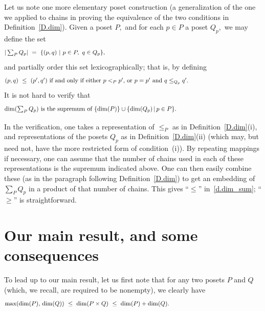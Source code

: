 \documentclass{amsart}
\numberwithin{equation}{section}
\numberwithin{theorem}{section}
\renewcommand{\r}{\mathrm}
\newcommand{\2}{\mathbf{2}}
\begin{document}
Let us note one more elementary poset construction
(a generalization of the one we applied to chains
in proving the equivalence of the two conditions
in Definition~\ref{D.dim}).
Given a poset $P,$ and for each $p\in P$ a poset $Q_p,$
we may define the set
%
\begin{equation}\begin{minipage}[c]{35pc}\label{d.sum_set}
$|\sum_P Q_p| \ = \ \{(p,q)~|~p\in P,~q\in Q_p\},$
\end{minipage}\end{equation}
%
and partially order this set lexicographically; that is, by defining
%
\begin{equation}\begin{minipage}[c]{35pc}\label{d.sum_ord}
$(p,q)~\leq~(p',q')$ if and only if either $p<_P p',$
or $p=p'$ and $q\leq_{Q_p} q'.$
\end{minipage}\end{equation}
%
It is not hard to verify that
%
\begin{equation}\begin{minipage}[c]{35pc}\label{d.dim_sum}
$\dim(\sum_P Q_p)$ is the supremum of
$\{\dim(P)\} \cup \{\dim(Q_p)\,|\,p\in P\}.$
\end{minipage}\end{equation}

In the verification, one takes a representation
of $\leq_P$ as in Definition~\ref{D.dim}(i), and
representations of the posets $Q_p$ as in Definition~\ref{D.dim}(ii)
(which may, but need not, have the more restricted
form of condition~(i)).
By repeating mappings if necessary, one can assume that the number of
chains used in each of these representations is the supremum
indicated above.
One can then easily combine these (as in the paragraph
following Definition~\ref{D.dim}) to get an embedding
of $\sum_P Q_p$ in a product of that number of chains.
This gives ``$\leq$'' in~\eqref{d.dim_sum};
``$\geq$'' is straightforward.

\section{Our main result, and some consequences}\label{S.main}

To lead up to our main result, let us first note
that for any two posets $P$ and $Q$ (which, we recall,
are required to be nonempty), we clearly have
%
\begin{equation}\begin{minipage}[c]{35pc}\label{d.sup_<dim_<sum}
$\r{max}(\dim(P),\,\dim(Q))\ \leq\ \dim(P\times Q)\ %
\leq\ \dim(P)+\dim(Q).$
\end{minipage}\end{equation}
\end{document}
